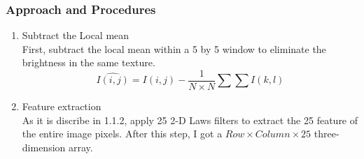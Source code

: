 \documentclass[11pt]{article}
\begin{document}
\subsubsection{Approach and Procedures}
\begin{enumerate}

\item Subtract the Local mean\\
First, subtract the local mean within a 5 by 5 window to eliminate the brightness in the same texture. 
\begin{equation}
\hat { I(i,j) } =I(i,j)-\frac { 1 }{ N\times N } \sum { \sum { I(k,l) }  } 
\end{equation}
\item Feature extraction\\
As it is discribe in 1.1.2, apply 25 2-D Laws filters to extract the 25 feature of the entire image pixels. After this step, I got a $Row \times Column \times 25$ three-dimension array. 
	
\begin{figure}[!htbp]
	\centering    
	 

\end{figure}
\end{enumerate}
\end{document}
